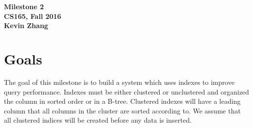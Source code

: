 \documentclass[12pt]{article}
\begin{document}
\begin{center}
\textbf{Milestone 2 \\ CS165, Fall 2016 \\ Kevin Zhang}
\end{center}

\section{Goals}
The goal of this milestone is to build a system which uses indexes to improve query performance.  Indexes must be either clustered or unclustered and organized the column in sorted order or in a B-tree.  Clustered indexes will have a leading column that all columns in the cluster are sorted according to.  We assume that all clustered indices will be created before any data is inserted.
\end{document}
